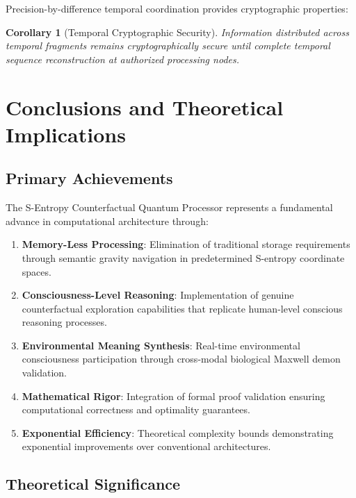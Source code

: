 \documentclass[12pt,a4paper]{article}
\newtheorem{corollary}{Corollary}
\begin{document}
Precision-by-difference temporal coordination provides cryptographic properties:

\begin{corollary}[Temporal Cryptographic Security]
Information distributed across temporal fragments remains cryptographically secure until complete temporal sequence reconstruction at authorized processing nodes.
\end{corollary}

\section{Conclusions and Theoretical Implications}

\subsection{Primary Achievements}

The S-Entropy Counterfactual Quantum Processor represents a fundamental advance in computational architecture through:

\begin{enumerate}
\item \textbf{Memory-Less Processing}: Elimination of traditional storage requirements through semantic gravity navigation in predetermined S-entropy coordinate spaces.

\item \textbf{Consciousness-Level Reasoning}: Implementation of genuine counterfactual exploration capabilities that replicate human-level conscious reasoning processes.

\item \textbf{Environmental Meaning Synthesis}: Real-time environmental consciousness participation through cross-modal biological Maxwell demon validation.

\item \textbf{Mathematical Rigor}: Integration of formal proof validation ensuring computational correctness and optimality guarantees.

\item \textbf{Exponential Efficiency}: Theoretical complexity bounds demonstrating exponential improvements over conventional architectures.
\end{enumerate}

\subsection{Theoretical Significance}
\end{document}

